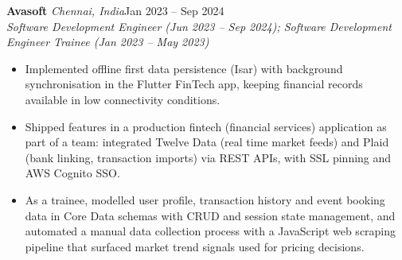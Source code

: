 \documentclass[a4paper,11pt]{article}
\newcommand{\role}[4]{%
  \textbf{#1}{\color{muted}\,\textperiodcentered\,\textit{#2}}\hfill{\color{muted}#3}\\
  \textit{#4}\par}
\newcommand{\gap}{\vspace{5pt}}
\begin{document}
\gap
{}
\role{Avasoft}{Chennai, India}{Jan 2023 – Sep 2024}{Software Development Engineer (Jun 2023 – Sep 2024); Software Development Engineer Trainee (Jan 2023 – May 2023)}
\begin{itemize}
  \item Implemented offline first data persistence (Isar) with background synchronisation in the Flutter FinTech app, keeping financial records available in low connectivity conditions.
  \item Shipped features in a production fintech (financial services) application as part of a team: integrated Twelve Data (real time market feeds) and Plaid (bank linking, transaction imports) via REST APIs, with SSL pinning and AWS Cognito SSO.
  \item As a trainee, modelled user profile, transaction history and event booking data in Core Data schemas with CRUD and session state management, and automated a manual data collection process with a JavaScript web scraping pipeline that surfaced market trend signals used for pricing decisions.
\end{itemize}
\end{document}
